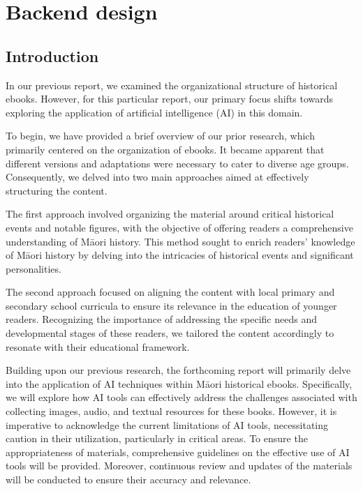 \chapter{Backend design} 

\section{Introduction}

In our previous report, we examined the organizational structure of historical ebooks. 
However, for this particular report, our primary focus shifts towards exploring the application of artificial intelligence (AI) in this domain.

To begin, we have provided a brief overview of our prior research, which primarily centered on the organization of ebooks. 
It became apparent that different versions and adaptations were necessary to cater to diverse age groups. 
Consequently, we delved into two main approaches aimed at effectively structuring the content.

The first approach involved organizing the material around critical historical events and notable figures, with the objective of offering readers a comprehensive understanding of Māori history. 
This method sought to enrich readers' knowledge of Māori history by delving into the intricacies of historical events and significant personalities.

The second approach focused on aligning the content with local primary and secondary school curricula to ensure its relevance in the education of younger readers. 
Recognizing the importance of addressing the specific needs and developmental stages of these readers, we tailored the content accordingly to resonate with their educational framework.

Building upon our previous research, the forthcoming report will primarily delve into the application of AI techniques within Māori historical ebooks. 
Specifically, we will explore how AI tools can effectively address the challenges associated with collecting images, audio, and textual resources for these books. 
However, it is imperative to acknowledge the current limitations of AI tools, necessitating caution in their utilization, particularly in critical areas. 
To ensure the appropriateness of materials, comprehensive guidelines on the effective use of AI tools will be provided. 
Moreover, continuous review and updates of the materials will be conducted to ensure their accuracy and relevance.

